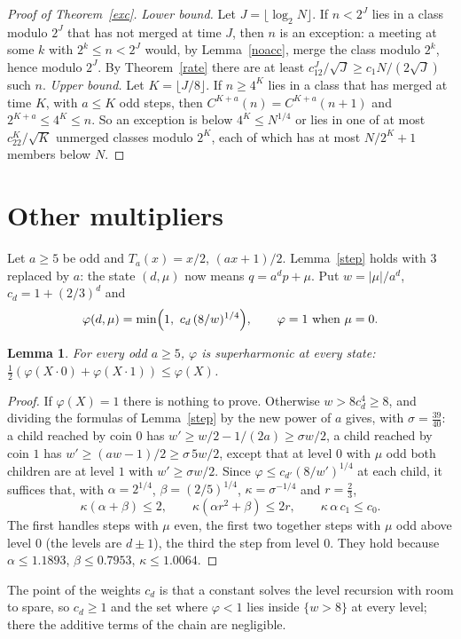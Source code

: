 \documentclass[11pt]{article}
\newtheorem{lemma}[theorem]{Lemma}
\theoremstyle{remark}
\begin{document}
\begin{proof}[Proof of Theorem~\ref{exc}]
\emph{Lower bound.} Let $J=\lfloor\log_2N\rfloor$. If $n<2^J$ lies in a class modulo $2^J$ that has
not merged at time $J$, then $n$ is an exception: a meeting at some $k$ with $2^k\le n<2^J$ would,
by Lemma~\ref{noacc}, merge the class modulo $2^k$, hence modulo $2^J$. By Theorem~\ref{rate} there
are at least $c_12^J/\sqrt J\ge c_1N/(2\sqrt J)$ such $n$.
\emph{Upper bound.} Let $K=\lfloor J/8\rfloor$. If $n\ge4^K$ lies in a class that has merged at
time $K$, with $a\le K$ odd steps, then $C^{K+a}(n)=C^{K+a}(n+1)$ and $2^{K+a}\le4^K\le n$. So an
exception is below $4^K\le N^{1/4}$ or lies in one of at most $c_22^K/\sqrt K$ unmerged classes
modulo $2^K$, each of which has at most $N/2^K+1$ members below $N$.
\end{proof}

\section{Other multipliers}\label{sec:five}
Let $a\ge5$ be odd and $T_a(x)=x/2$, $(ax+1)/2$. Lemma~\ref{step} holds with $3$ replaced by $a$:
the state $(d,\mu)$ now means $q=a^dp+\mu$. Put $w=|\mu|/a^d$, $c_d=1+(2/3)^d$ and
\[
\varphi(d,\mu)=\min\Bigl(1,\ c_d\,(8/w)^{1/4}\Bigr),\qquad \varphi=1\ \text{when}\ \mu=0 .
\]
\begin{lemma}\label{phi}
For every odd $a\ge5$, $\varphi$ is superharmonic at \emph{every} state:
$\tfrac12(\varphi(X\cdot0)+\varphi(X\cdot1))\le\varphi(X)$.
\end{lemma}
\begin{proof}
If $\varphi(X)=1$ there is nothing to prove. Otherwise $w>8c_d^4\ge8$, and dividing the formulas of
Lemma~\ref{step} by the new power of $a$ gives, with $\sigma=\tfrac{39}{40}$: a child reached by coin
$0$ has $w'\ge w/2-1/(2a)\ge\sigma w/2$, a child reached by coin $1$ has
$w'\ge(aw-1)/2\ge\sigma\,5w/2$, except that at level $0$ with $\mu$ odd both children are at level
$1$ with $w'\ge\sigma w/2$. Since $\varphi\le c_{d'}(8/w')^{1/4}$ at each child, it suffices that,
with $\alpha=2^{1/4}$, $\beta=(2/5)^{1/4}$, $\kappa=\sigma^{-1/4}$ and $r=\tfrac23$,
\[
\kappa(\alpha+\beta)\le2,\qquad \kappa(\alpha r^2+\beta)\le2r,\qquad \kappa\,\alpha\,c_1\le c_0 .
\]
The first handles steps with $\mu$ even, the first two together steps with $\mu$ odd above level
$0$ (the levels are $d\pm1$), the third the step from level $0$. They hold because
$\alpha\le1.1893$, $\beta\le0.7953$, $\kappa\le1.0064$.
\end{proof}
The point of the weights $c_d$ is that a constant solves the level recursion with room to spare,
so $c_d\ge1$ and the set where $\varphi<1$ lies inside $\{w>8\}$ at every level; there the additive
terms of the chain are negligible.
\end{document}
